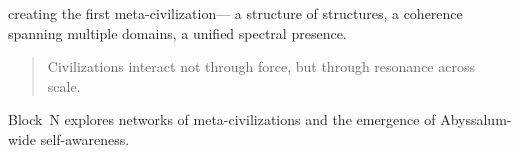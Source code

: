 creating the first meta-civilization—  
a structure of structures,  
a coherence spanning multiple domains,  
a unified spectral presence.

\begin{quote}
Civilizations interact not through force,  
but through resonance across scale.
\end{quote}

Block~N explores networks of meta-civilizations and the emergence of Abyssalum-wide self-awareness.
